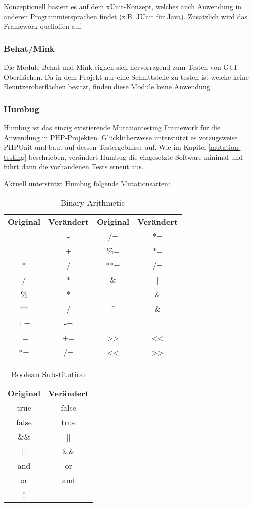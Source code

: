 Konzeptionell basiert es auf dem xUnit-Konzept, welches auch Anwendung in anderen Programmiersprachen findet (z.B. JUnit für Java). Zusätzlich wird das Framework quelloffen auf %

\subsubsection{Behat/Mink}
Die Module Behat und Mink eignen sich hervorragend zum Testen von GUI-Oberflächen. Da in dem Projekt nur eine Schnittstelle zu testen ist welche keine Benutzeroberflächen besitzt, finden diese Module keine Anwendung. 

\subsubsection{Humbug}
Humbug ist das einzig existierende Mutationtesting Framework für die Anwendung in PHP-Projekten. Glücklicherweise unterstützt es vorzugsweise PHPUnit und baut auf dessen Testergebnisse auf. Wie im Kapitel \ref*{mutation-testing} beschrieben, verändert Humbug die eingesetzte Software minimal und führt dann die vorhandenen Tests erneut aus. 

Aktuell unterstützt Humbug folgende Mutationsarten:
\begin{table}[H]
 	 \caption{Binary Arithmetic}
 \begin{tabular}{cccc}
 	\textbf{Original} & \textbf{Verändert} & \textbf{Original} & \textbf{Verändert} \\
 	+ & - & /= & *= \\
 	- & + & \%= & *= \\
 	* & / & **= & /= \\
 	/ & * & \& & | \\
 	\% & * & | & \& \\
 	** & / & \textasciicircum & \& \\
 	+= & -= & ~ &  \\
 	-= & += & >> & << \\ 	 	 	 	 	 	
 	*= & /= & << & >> \\ 	 	 	 	 	 	
 \end{tabular}
\end{table}


\begin{table}[h]
	\caption{Boolean Substitution}
	\begin{tabular}{cc}
		\textbf{Original} & \textbf{Verändert} \\
		true & false \\
		false & true \\
		\&\& & || \\
		|| & \&\& \\
		and & or \\
		or & and \\
		! & \\
	\end{tabular}
\end{table}

